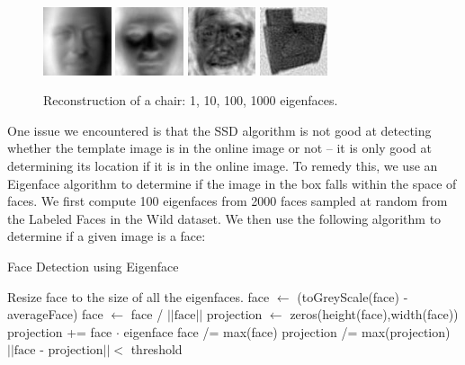 \documentclass[10pt,twocolumn,letterpaper]{article}
\begin{document}
\begin{figure}[ht!]
\centering
\includegraphics[width=20mm]{./eigenface/reconstruction/nonface_proj_1.jpg}
\includegraphics[width=20mm]{./eigenface/reconstruction/nonface_proj_10.jpg}
\includegraphics[width=20mm]{./eigenface/reconstruction/nonface_proj_100.jpg}
\includegraphics[width=20mm]{./eigenface/reconstruction/nonface_proj_1000.jpg}
\caption{Reconstruction of a chair: 1, 10, 100, 1000 eigenfaces.\label{overflow}}
\end{figure}



One issue we encountered is that the SSD algorithm is not good at detecting whether the template image is in the online image or not -- it is only good at determining its location if it is in the online image. To remedy this, we use an Eigenface algorithm \cite{eigenfaces} to determine if the image in the box falls within the space of faces. We first compute 100 eigenfaces from 2000 faces sampled at random from the Labeled Faces in the Wild \cite{lfw} dataset. We then use the following algorithm to determine if a given image is a face:

\begin{algorithm}
 \caption{Face Detection using Eigenface}
 \begin{algorithmic}[1]
  \State Resize face to the size of all the eigenfaces.
  \State face $\leftarrow$ (toGreyScale(face) - averageFace)
  \State face $\leftarrow$ face / $||\mbox{face}||$
  \State projection $\leftarrow$ zeros(height(face),width(face))
     \State projection += face $\cdot$ eigenface
  \EndFor
  \State face /= max(face)
  \State projection /= max(projection)
  \State \Return $||\mbox{face - projection}|| <$ threshold
  \EndProcedure
 \end{algorithmic}
\end{algorithm}
\end{document}
